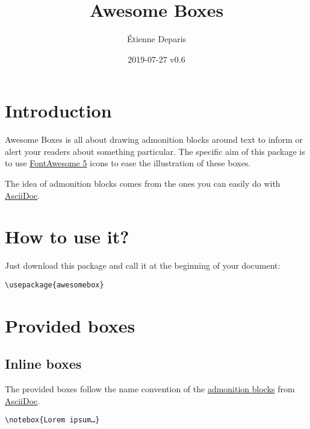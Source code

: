 \documentclass[a4paper,12pt]{article}
\title{Awesome Boxes}
\author{Étienne Deparis}
\date{2019-07-27 v0.6}
\newcommand\hrefcolor[2]{\textcolor{magenta}{\href{#1}{#2}}}
\begin{document}
\maketitle

\section{Introduction}

Awesome Boxes is all about drawing admonition blocks around text to
inform or alert your readers about something particular. The specific
aim of this package is to use
\hrefcolor{https://fontawesome.com/}{FontAwesome 5} icons to ease the
illustration of these boxes.

The idea of admonition blocks comes from the ones you can easily do with
\hrefcolor{http://asciidoctor.org/docs/user-manual/\#admonition}{AsciiDoc}.

\section{How to use it?}

Just download this package and call it at the beginning of your
document:

\begin{center}
\verb!\usepackage{awesomebox}!
\end{center}

\section{Provided boxes}
\subsection{Inline boxes}

The provided boxes follow the name convention of the
\hrefcolor{http://asciidoctor.org/docs/user-manual/\#admonition}{admonition
  blocks} from \hrefcolor{http://asciidoctor.org}{AsciiDoc}.

\begin{center}
\verb!\notebox{Lorem ipsum…}!
\end{center}

\end{document}

